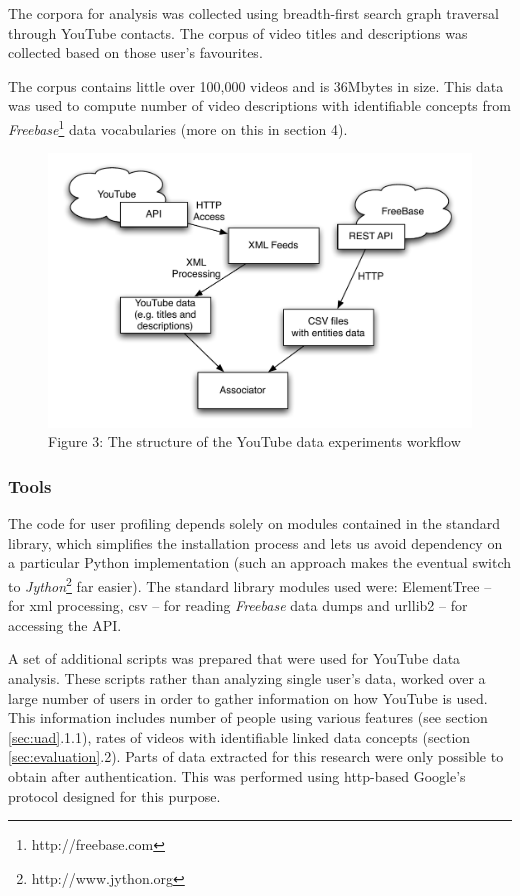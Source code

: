 The corpora for analysis was collected using breadth-first search graph
traversal through YouTube contacts. The corpus of video titles and descriptions
was collected based on those user's favourites.

The corpus contains little over 100,000 videos and is 36Mbytes in size. This
data was used to compute number of video descriptions with identifiable concepts from
\textit{Freebase}\footnote{http://freebase.com} data vocabularies (more on this in section 4).

\begin{figure}[h!]
  \begin{center}
	  \includegraphics[scale=0.65]{images/youtube_diagram.pdf} \\
	  Figure 3: The structure of the YouTube data experiments workflow
  \end{center}
\end{figure}

\subsubsection{Tools}

The code for user profiling depends solely on modules contained in the standard
library, which simplifies the installation process and lets us avoid dependency
on a particular Python implementation (such an approach makes the eventual
switch to \textit{Jython}\footnote{http://www.jython.org} far easier). The
standard library modules used were: ElementTree -- for xml processing, csv --
for reading \textit{Freebase} data dumps and urllib2 -- for accessing the API.

A set of additional scripts was prepared that were used for YouTube data
analysis. These scripts rather than analyzing single user's data, worked over a
large number of users in order to gather information on how YouTube is used.
This information includes number of people using various features (see section
\ref{sec:uad}.1.1), rates of videos with identifiable linked data concepts (section
\ref{sec:evaluation}.2).
Parts of data extracted for this research were only possible to obtain after
authentication. This was performed using http-based Google's protocol designed
for this purpose.
